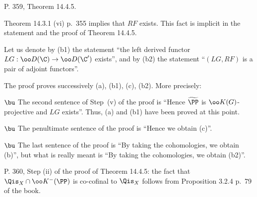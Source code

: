 \documentclass[12pt]{article}
\theoremstyle{remark}
\theoremstyle{definition}
\begin{document}
%

\begin{s}
P. 359, Theorem 14.4.5. 

Theorem 14.3.1 (vi) p.~355 implies that $RF$ exists. This fact is implicit in the statement and the proof of Theorem 14.4.5.

Let us denote by (b1) the statement ``the left derived functor $LG:\oo D(\C)\to\oo D(\C')$ exists'', and by (b2) the statement ``$(LG,RF)$ is a pair of adjoint functors''.

The proof proves successively (a), (b1), (c), (b2). More precisely:

\nn$\bu$ The second sentence of Step~(v) of the proof is ``Hence $\widetilde\PP$ is $\oo K(G)$-projective and $LG$ exists''. Thus, (a) and (b1) have been proved at this point. 

\nn$\bu$ The penultimate sentence of the proof is ``Hence we obtain (c)''. 

\nn$\bu$ The last sentence of the proof is ``By taking the cohomologies, we obtain (b)'', but what is really meant is ``By taking the cohomologies, we obtain (b2)''.
\end{s}

%

\begin{s}
P. 360, Step (ii) of the proof of Theorem 14.4.5: the fact that $\Qis_X\cap\oo K^-(\PP)$ is co-cofinal to $\Qis_X$ follows from Proposition 3.2.4 p.~79 of the book.
\end{s}

%



\end{document}
